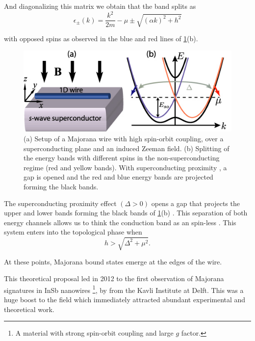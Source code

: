 And diagonalizing this matrix we obtain that the band splits as 
\begin{equation}
    \epsilon_\pm(k) = \frac{k^2}{2m} -\mu \pm \sqrt{(\alpha k)^2+h^2}
\end{equation}

\noindent with opposed spins as observed in the blue and red lines of \ref{fig:spin-orbit}(b).  


\begin{figure}[t]
    \centering
    \includegraphics[scale=0.7]{IMAGES/Majorana/Mwire.png}
    \caption{ \label{fig:spin-orbit} (a) Setup of a Majorana wire with high spin-orbit coupling, over a superconducting plane and an induced Zeeman field. (b) Splitting of the energy bands with different spins in the non-superconducting regime (red and yellow bands). With superconducting proximity , a gap is opened and the red and blue energy bands are projected forming the black bands. \protect{}}
\end{figure}


The superconducting proximity effect $(\Delta>0)$ opens a gap  that projects the upper and lower bands forming the black bands of \ref{fig:spin-orbit}(b) . This separation of both energy channels allows us to think the conduction band as an spin-less . This system enters into the topological phase  when 
\begin{equation}
  h > \sqrt{\Delta^2 +\mu^2 }. 
  \label{eq:topcond}
\end{equation}

At these points, Majorana bound states emerge at the edges of the wire.

This theoretical proposal led in 2012 to the first observation of Majorana signatures in InSb nanowires \footnote{A material with strong spin-orbit coupling and large $g$ factor.}, by \citeauthor{mourik_signatures_2012} from the Kavli Institute at Delft. This was a huge boost to the field which immediately attracted abundant experimental and theoretical work. 

